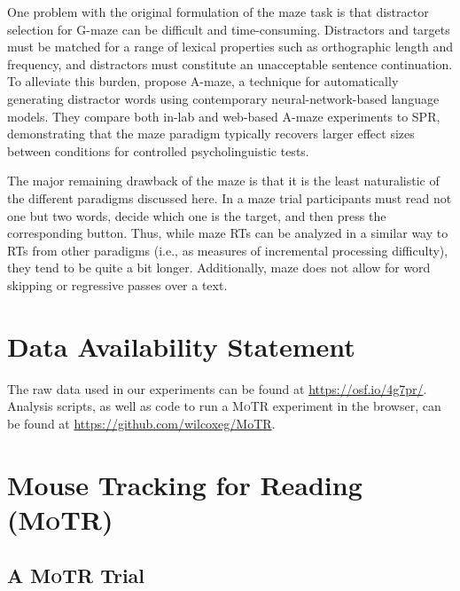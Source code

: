 \documentclass[12pt]{article}
\newcommand{\motr}{\textsc{MoTR}\xspace}
\begin{document}
One problem with the original formulation of the maze task is that distractor selection for G-maze can be difficult and time-consuming. Distractors and targets must be matched for a range of lexical properties such as orthographic length and frequency, and distractors must constitute an unacceptable sentence continuation. To alleviate this burden, \cite{boyce2020amaze} propose A-maze, a technique for automatically generating distractor words using contemporary neural-network-based language models. They compare both in-lab and web-based A-maze experiments to SPR, demonstrating that the maze paradigm typically recovers larger effect sizes between conditions for controlled psycholinguistic tests.

The major remaining drawback of the maze is that it is the least naturalistic of the different paradigms discussed here. In a maze trial participants must read not one but two words, decide which one is the target, and then press the corresponding button. Thus, while maze RTs can be analyzed in a similar way to RTs from other paradigms (i.e., as measures of incremental processing difficulty), they tend to be quite a bit longer. Additionally, maze does not allow for word skipping or regressive passes over a text.

\section{Data Availability Statement}

The raw data used in our experiments can be found at \url{https://osf.io/4g7pr/}. Analysis scripts, as well as code to run a \motr experiment in the browser, can be found at \url{https://github.com/wilcoxeg/MoTR}.


\section{Mouse Tracking for Reading (\motr)} \label{sec:motr}


\subsection{A \motr Trial}
\end{document}
